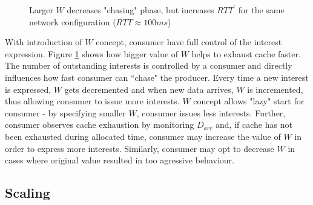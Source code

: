 \documentclass{icn/sig-alternate-2012} %
\begin{document}
\begin{figure}[t!]
\centering
\begin{scriptsize}
\end{scriptsize}
\caption{Larger $W$ decreases "chasing" phase, but increases $RTT^\prime$ for the same network configuration ($RTT\approx100ms$)}
\label{fig:ws}
\end{figure}

With introduction of $W$ concept, consumer have full control of the interest expression. Figure \ref{fig:ws} shows how bigger value of $W$ helps to exhaust cache faster. The number of outstanding interests is controlled by a consumer and directly influences how fast consumer can ``chase" the producer. Every time a new interest is expressed, $W$ gets decremented and when new data arrives, $W$ is incremented, thus allowing consumer to issue more interests. $W$ concept allows "lazy" start for consumer - by specifying smaller $W$, consumer issues less interests. Further, consumer observes cache exhaustion by monitoring $D_{arr}$ and, if cache has not been exhausted during allocated time, consumer may increase the value of $W$ in order to express more interests. Similarly, consumer may opt to decrease $W$ in cases where original value resulted in too agressive behaviour.






\subsection{Scaling}
\end{document}
